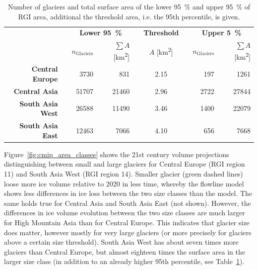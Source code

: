       \begin{table}[htp]
        \centering
        \small

        \caption{Number of glaciers and total surface area of the lower \SI{95}{\percent} and upper \SI{95}{\percent}  of RGI area, additional the threshold area, i.e. the 95th percentile, is given.}
        \label{tab:area_percentile}
          
        \begin{tabular}{@{}rlrrlclrr@{}}
          \toprule
          {} & \phantom{a} & \multicolumn{2}{c}{\textbf{Lower \SI{95}{\percent}}} & \phantom{a} & \textbf{Threshold} & \phantom{a} & \multicolumn{2}{c}{\textbf{Upper \SI{5}{\percent}}} \\
          {} & {} & $n_\text{Glaciers}$ & $\sum A$ [\si{\square\kilo\meter}] & {} & $A$ [\si{\square\kilo\meter}] & {} & $n_\text{Glaciers}$ & $\sum A$ [\si{\square\kilo\meter}] \\
          \midrule
          \textbf{Central Europe} & & 3730 & 831 & & 2.15 & & 197 & 1261 \\
          \textbf{Central Asia} & & 51707 & 21460 & & 2.96 & & 2722 & 27844 \\
          \textbf{South Asia West} & & 26588 & 11490 & & 3.46 & & 1400 & 22079 \\
          \textbf{South Asia East} & & 12463 & 7066 & & 4.10 & & 656 & 7668 \\

          \bottomrule
        \end{tabular}
      \end{table}

      Figure~\ref{fig:cmip_area_classes} shows the 21st century volume projections distinguishing between small and large glaciers for Central Europe (RGI region 11) and South Asia West (RGI region 14). Smaller glacier (green dashed lines) loose more ice volume relative to 2020 in less time, whereby the flowline model shows less differences in ice loss between the two size classes than the \vas{} model. The same holds true for Central Asia and South Asia East (not shown). However, the differences in ice volume evolution between the two size classes are much larger for High Mountain Asia than for Central Europe. This indicates that glacier size does matter, however mostly for very large glaciers (or more precisely for glaciers above a certain size threshold). South Asia West has about seven times more glaciers than Central Europe, but almost eighteen times the surface area in the larger size class (in addition to an already higher 95th percentile, see Table~\ref{tab:area_percentile}).

